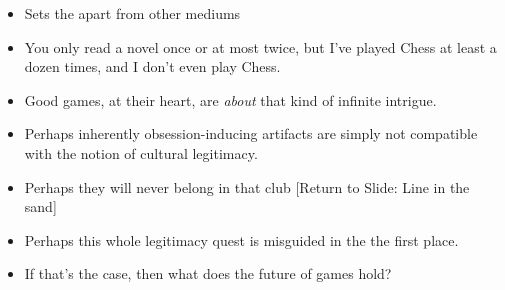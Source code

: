 \documentclass[12pt]{article}
\begin{document}
{\begin{itemize}
\item Sets the apart from other mediums

\item You only read a novel once or at most twice, but I've played Chess at least a dozen times, and I don't even play Chess.

\item Good games, at their heart, are {\it about} that kind of infinite intrigue.

\item Perhaps inherently obsession-inducing artifacts are simply not compatible with the notion of cultural legitimacy.

\item Perhaps they will never belong in that club [Return to Slide:  Line in the sand]

\item Perhaps this whole legitimacy quest is misguided in the the first place.

\item If that's the case, then what does the future of games hold?


\end{itemize}
}
\end{document}
